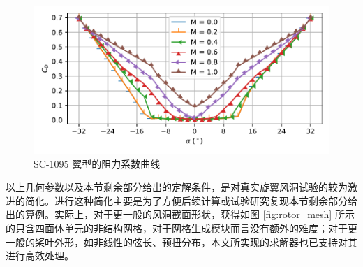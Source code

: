 \begin{figure}[h!]
\begin{centering}
\includegraphics[width=1\textwidth,height=0.26\textheight,keepaspectratio]{figures/airfoil/drag}
\par\end{centering}
\caption{\label{fig:rotor_c_drag}SC-1095 翼型的阻力系数曲线}
\end{figure}

以上几何参数以及本节剩余部分给出的定解条件，是对真实旋翼风洞试验的较为激进的简化。进行这种简化主要是为了方便后续计算或试验研究复现本节剩余部分给出的算例。实际上，对于更一般的风洞截面形状，获得如图
\ref{fig:rotor_mesh} 所示的只含四面体单元的非结构网格，对于网格生成模块而言没有额外的难度；对于更一般的桨叶外形，如非线性的弦长、预扭分布，本文所实现的求解器也已支持对其进行高效处理。


